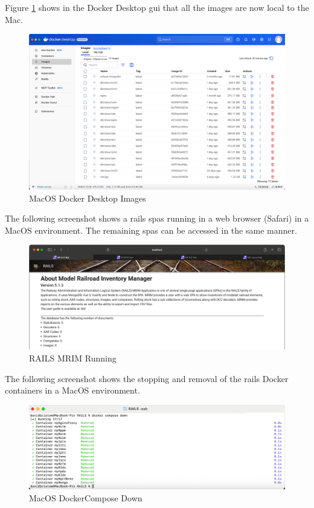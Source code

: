 Figure \ref{fig:mac-docker-desktop-images} shows in the Docker Desktop \gls{gui} that all the images are now local to the Mac.
\begin{figure}[H]
    \centering
    \includegraphics[scale=0.3]{../Images/images-mac.png}
    \caption{MacOS Docker Desktop Images}
    \label{fig:mac-docker-desktop-images}
\end{figure}
The following screenshot shows a \gls{rails} \glspl{spa} running in a web browser (Safari) in a MacOS environment. The remaining \glspl{spa} can be accessed in the same manner.
\begin{figure}[H]
    \centering
    \includegraphics[scale=0.3]{../Images/mrim-home-mac.png}
    \caption{RAILS MRIM Running}
    \label{fig:rails-mrim}
\end{figure}
The following screenshot shows the stopping and removal of the \gls{rails} Docker containers in a MacOS environment.
\begin{figure}[H]
    \centering
    \includegraphics[scale=0.45]{../Images/dc-down-mac.png}
    \caption{MacOS DockerCompose Down}
    \label{fig:mac-docker-cmds-3}
\end{figure}
